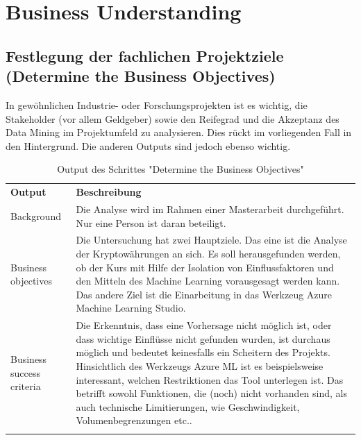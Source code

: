 \section{Business Understanding}\label{sec:p1}
\subsection{Festlegung der fachlichen Projektziele (Determine the Business Objectives)}
In gewöhnlichen Industrie- oder Forschungsprojekten ist es wichtig, die Stakeholder (vor allem Geldgeber) sowie den Reifegrad und die Akzeptanz des Data Mining im Projektumfeld zu analysieren. Dies rückt im vorliegenden Fall in den Hintergrund. Die anderen Outputs sind jedoch ebenso wichtig.

\begin{centering} \begin{longtable}[H]{|p{}|p{12cm}|}
\hline
\textbf{Output} & \textbf{Beschreibung} \\ 
\hhline{==}
Background & Die Analyse wird im Rahmen einer Masterarbeit durchgeführt. Nur eine Person ist daran beteiligt. \\
\hline
Business objectives & Die Untersuchung hat zwei Hauptziele. Das eine ist die Analyse der Kryptowährungen an sich. Es soll herausgefunden werden, ob der Kurs mit Hilfe der Isolation von Einflussfaktoren und den Mitteln des Machine Learning vorausgesagt werden kann. Das andere Ziel ist die Einarbeitung in das Werkzeug Azure Machine Learning Studio. \\
\hline
Business success criteria & Die Erkenntnis, dass eine Vorhersage nicht möglich ist, oder dass wichtige Einflüsse nicht gefunden wurden, ist durchaus möglich und bedeutet keinesfalls ein Scheitern des Projekts. Hinsichtlich des Werkzeugs Azure ML ist es beispielsweise interessant, welchen Restriktionen das Tool unterlegen ist. Das betrifft sowohl Funktionen, die (noch) nicht vorhanden sind, als auch technische Limitierungen, wie Geschwindigkeit, Volumenbegrenzungen etc..\\
\hline
\caption{Output des Schrittes "Determine the Business Objectives"}
\end{longtable} \end{centering}
